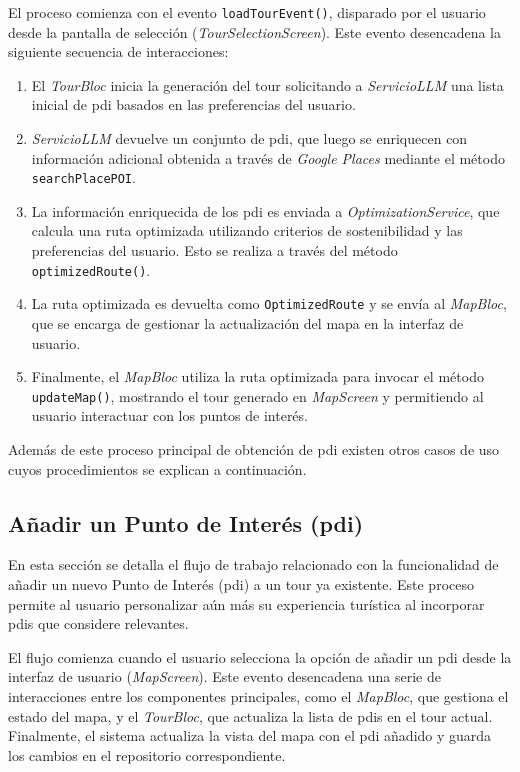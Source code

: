 El proceso comienza con el evento \texttt{loadTourEvent()}, disparado por el usuario desde la pantalla de selección (\textit{TourSelectionScreen}). Este evento desencadena la siguiente secuencia de interacciones:
\begin{enumerate}
	\item El \textit{TourBloc} inicia la generación del tour solicitando a \textit{ServicioLLM} una lista inicial de \acrlong{pdi} basados en las preferencias del usuario.
	\item \textit{ServicioLLM} devuelve un conjunto de \acrlong{pdi}, que luego se enriquecen con información adicional obtenida a través de \textit{Google Places} mediante el método \texttt{searchPlacePOI}.
	\item La información enriquecida de los \acrlong{pdi} es enviada a \textit{OptimizationService}, que calcula una ruta optimizada utilizando criterios de sostenibilidad y las preferencias del usuario. Esto se realiza a través del método \texttt{optimizedRoute()}.
	\item La ruta optimizada es devuelta como \texttt{OptimizedRoute} y se envía al \textit{MapBloc}, que se encarga de gestionar la actualización del mapa en la interfaz de usuario.
	\item Finalmente, el \textit{MapBloc} utiliza la ruta optimizada para invocar el método \texttt{updateMap()}, mostrando el tour generado en \textit{MapScreen} y permitiendo al usuario interactuar con los puntos de interés.
\end{enumerate}
Además de este proceso principal de obtención de \acrlong{pdi} existen otros casos de uso cuyos procedimientos se explican a continuación.
\subsection{Añadir un Punto de Interés (\acrshort{pdi})}
En esta sección se detalla el flujo de trabajo relacionado con la funcionalidad de añadir un nuevo Punto de Interés (\acrshort{pdi}) a un tour ya existente. Este proceso permite al usuario personalizar aún más su experiencia turística al incorporar \acrshort{pdi}s que considere relevantes.

El flujo comienza cuando el usuario selecciona la opción de añadir un \acrshort{pdi} desde la interfaz de usuario (\textit{MapScreen}). Este evento desencadena una serie de interacciones entre los componentes principales, como el \textit{MapBloc}, que gestiona el estado del mapa, y el \textit{TourBloc}, que actualiza la lista de \acrshort{pdi}s en el tour actual. Finalmente, el sistema actualiza la vista del mapa con el \acrshort{pdi} añadido y guarda los cambios en el repositorio correspondiente.

